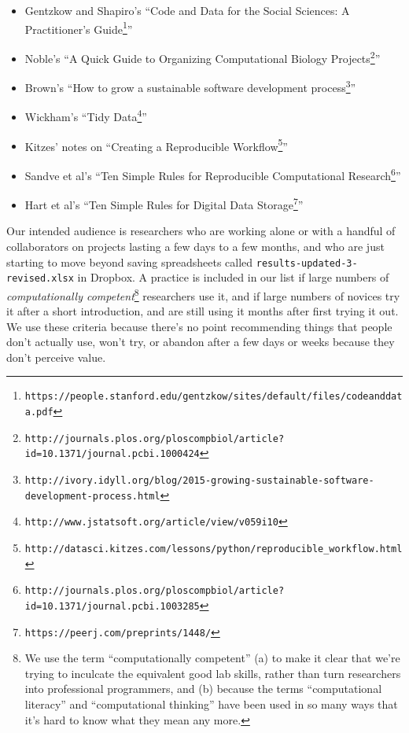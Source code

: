 \documentclass[10pt]{article}
\newcommand{\withurl}[2]{{#1}\footnote{\texttt{#2}}}
\begin{document}
\begin{itemize}
\itemsep1pt\parskip0pt
\item
  Gentzkow and Shapiro's ``\withurl{Code and Data for the Social
    Sciences: A Practitioner's
    Guide}{https://people.stanford.edu/gentzkow/sites/default/files/codeanddata.pdf}''
\item
  Noble's ``\withurl{A Quick Guide to Organizing Computational Biology
    Projects}{http://journals.plos.org/ploscompbiol/article?id=10.1371/journal.pcbi.1000424}''
\item
  Brown's ``\withurl{How to grow a sustainable software development
    process}{http://ivory.idyll.org/blog/2015-growing-sustainable-software-development-process.html}''
\item
  Wickham's ``\withurl{Tidy
    Data}{http://www.jstatsoft.org/article/view/v059i10}''
\item
  Kitzes' notes on ``\withurl{Creating a Reproducible
    Workflow}{http://datasci.kitzes.com/lessons/python/reproducible\_workflow.html}''
\item
  Sandve et al's ``\withurl{Ten Simple Rules for Reproducible
    Computational
    Research}{http://journals.plos.org/ploscompbiol/article?id=10.1371/journal.pcbi.1003285}''
\item
  Hart et al's ``\withurl{Ten Simple Rules for Digital Data
    Storage}{https://peerj.com/preprints/1448/}''
\end{itemize}

Our intended audience is researchers who are working alone or with a
handful of collaborators on projects lasting a few days to a few
months, and who are just starting to move beyond saving spreadsheets
called \texttt{results-updated-3-revised.xlsx} in Dropbox. A practice
is included in our list if large numbers of \emph{computationally
  competent}\footnote{We use the term ``computationally competent''
  (a) to make it clear that we're trying to inculcate the equivalent
  good lab skills, rather than turn researchers into professional
  programmers, and (b) because the terms ``computational literacy''
  and ``computational thinking'' have been used in so many ways that
  it's hard to know what they mean any more.} researchers use it, and
if large numbers of novices try it after a short introduction, and are
still using it months after first trying it out. We use these criteria
because there's no point recommending things that people don't
actually use, won't try, or abandon after a few days or weeks because
they don't perceive value.
\end{document}
